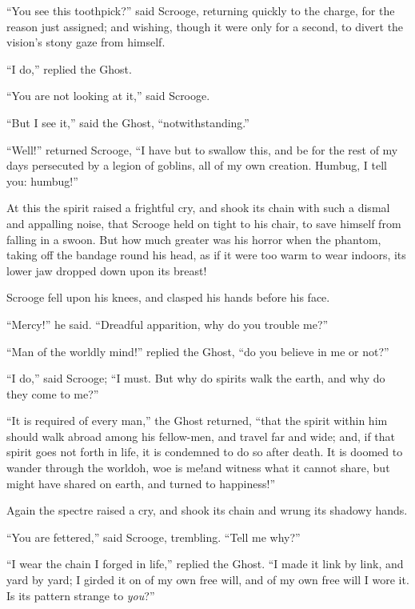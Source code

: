 \documentclass[paper=5.5in:8.5in,BCOR=10mm,twoside,DIV=15,12pt,usegeometry,openany]{scrbook} %
\begin{document}
\enquote{You see this toothpick?} said Scrooge, returning quickly to the charge, for the reason just assigned; and wishing, though it were only for a second, to divert the vision's stony gaze from himself.

\enquote{I do,} replied the Ghost.

\enquote{You are not looking at it,} said Scrooge.

\enquote{But I see it,} said the Ghost, \enquote{notwithstanding.}

\enquote{Well!} returned Scrooge, \enquote{I have but to swallow this, and be for the rest of my days persecuted by a legion of goblins, all of my own creation. Humbug, I tell you: humbug!}

At this the spirit raised a frightful cry, and shook its chain with such a dismal and appalling noise, that Scrooge held on tight to his chair, to save himself from falling in a swoon. But how much greater was his horror when the phantom, taking off the bandage round his head, as if it were too warm to wear indoors, its lower jaw dropped down upon its breast!

Scrooge fell upon his knees, and clasped his hands before his face.

\enquote{Mercy!} he said. \enquote{Dreadful apparition, why do you trouble me?}

\enquote{Man of the worldly mind!} replied the Ghost, \enquote{do you believe in me or not?}

\enquote{I do,} said Scrooge; \enquote{I must. But why do spirits walk the earth, and why do they come to me?}

\enquote{It is required of every man,} the Ghost returned, \enquote{that the spirit within him should walk abroad among his fellow-men, and travel far and wide; and, if that spirit goes not forth in life, it is condemned to do so after death. It is doomed to wander through the world\textemdash oh, woe is me!\textemdash and witness what it cannot share, but might have shared on earth, and turned to happiness!}

Again the spectre raised a cry, and shook its chain and wrung its shadowy hands.

\enquote{You are fettered,} said Scrooge, trembling. \enquote{Tell me why?}

\enquote{I wear the chain I forged in life,} replied the Ghost. \enquote{I made it link by link, and yard by yard; I girded it on of my own free will, and of my own free will I wore it. Is its pattern strange to \textit{you}?}
\end{document}
